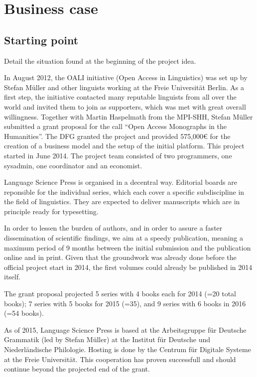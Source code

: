 \documentclass[nonflat,smallfont
]{langsci/langscibook}
\newcommand{\background}[1]{ 
  \vspace{5mm}
  \renewcommand{\tblslinecolour}{lsDarkBlue}
  \tblssy[red]{explore2}{Background}{\vspace*{-5mm}#1}
}
\newcommand{\langscisolution}[1]{
  \renewcommand{\tblslinecolour}{lsLightBlue}
  \tblssy{langsci}{LangSci solution}{\vspace*{-5mm}#1}
}
\renewcommand{\tblssy}[4][black!12]{%
  \renewcommand{\langscisymbol}{#2}\renewcommand{\tblsboxcolor}{#1}
  \begin{mdframed}[style=yellowexercise,frametitle={#3}]
    #4
  \end{mdframed}
}
\begin{document}
\chapter{Business case}
\section{Starting point}
\background{
Detail the situation found at the beginning of the project idea. 

}
\langscisolution{
In August 2012, the OALI initiative (Open Access in Linguistics) was set up by Stefan Müller and other linguists working at the Freie Universität Berlin. As a first step, the initiative contacted many reputable linguists from all over the world and invited them to join as supporters, which was met with great overall willingness. Together with Martin Haspelmath from the MPI-SHH, Stefan Müller submitted a grant proposal for the call  ``Open Access Monographs in the Humanities''. 
The DFG granted the project and provided 575,000€ for the creation of a business model and the setup of the initial platform. 
This project started in June 2014. The project team consisted of two programmers, one sysadmin, one coordinator and an economist. 

Language Science Press is organised in a decentral way. Editorial boards are reponsible for the individual series, which each cover a specific subdiscipline in the field of linguistics.  They are expected to deliver manuscripts which are in principle ready for typesetting. 

In order to lessen the burden of authors, and in order to assure a faster dissemination of scientific findings, we aim at a speedy publication, meaning a maximum period of 9 months between the initial submission and the publication online and in print. Given that the groundwork was already done before the official project start in 2014, the first volumes could already be published in 2014 itself. 

The grant proposal projected 5 series with 4 books each for 2014 (=20 total books); 7 series with 5 books for 2015 (=35), and 9 series with 6 books in 2016 (=54 books). 
 
As of 2015, Language Science Press is based at the Arbeitsgruppe für Deutsche Grammatik (led by Stefan Müller) at the Institut für Deutsche und Niederländische Philologie. Hosting is done by the Centrum für Digitale Systeme at the Freie Universität. This cooperation has proven successfull and should continue beyond the projected end of the grant.
}
\end{document}
